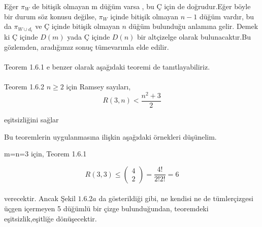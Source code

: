 \documentclass[11pt]{amsbook}
\begin{document}
\noindent Eğer $\pi_W$ de bitişik olmayan m düğüm varsa , bu $Ç$ için de doğrudur.Eğer böyle bir durum söz konusu değilse, $\pi_W$ içinde bitişik olmayan $n-1$ düğüm vardır, bu da $\pi_{W\cup d_i}$ ve $Ç$ içinde bitişik olmayan $n$ düğüm bulunduğu anlamına gelir. Demek ki $Ç$ içinde $D(m)$ yada $Ç$ içinde $D(n)$ bir altçizelge olarak bulunacaktır.Bu gözlemden, aradığımız sonuç tümevarımla elde edilir. \\ \\ 
\noindent Teorem 1.6.1 e benzer olarak aşağıdaki teoremi de tanıtlayabiliriz. \\ \\
\noindent Teorem 1.6.2 $n\geq2$ için Ramsey sayıları, \\ 
$$ R(3,n)< \frac{n^2+3}{2}$$ 
\begin{center}
eşitsizliğini sağlar \\
\end{center}
\noindent Bu teoremlerin uygulanmasına ilişkin aşağıdaki örnekleri düşünelim. \\
\begin{center}
m=n=3 için, Teorem 1.6.1
\end{center}
$$R(3,3)\leq \begin{pmatrix} 4 \\ 2 \end{pmatrix} = \frac{4!}{2!2!} = 6$$ \\
\noindent verecektir. Ancak Şekil $1.6.2a$ da gösterildiği gibi, ne kendisi ne de tümlerçizgesi üçgen içermeyen 5 düğümlü bir çizge bulunduğundan, teoremdeki eşitsizlik,eşitliğe dönüşecektir. 
\end{document}
